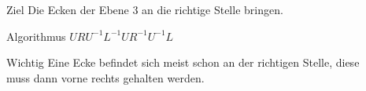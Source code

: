 \begin{frame}
\begin{columns}[c]
\begin{column}[C]{.5\textwidth}
		\end{column}
		\begin{column}[C]{.5\textwidth}
			\begin{block}{Ziel}
				Die Ecken der Ebene 3 an die richtige Stelle bringen.
			\end{block}
			\begin{exampleblock}{Algorithmus}
				$URU^{-1}L^{-1}UR^{-1}U^{-1}L$
			\end{exampleblock}
			\begin{alertblock}{Wichtig}
				Eine Ecke befindet sich meist schon an der richtigen Stelle, diese muss dann \glqq vorne rechts\grqq{} gehalten werden.
			\end{alertblock}
		\end{column}
	\end{columns}
	
\end{frame}

